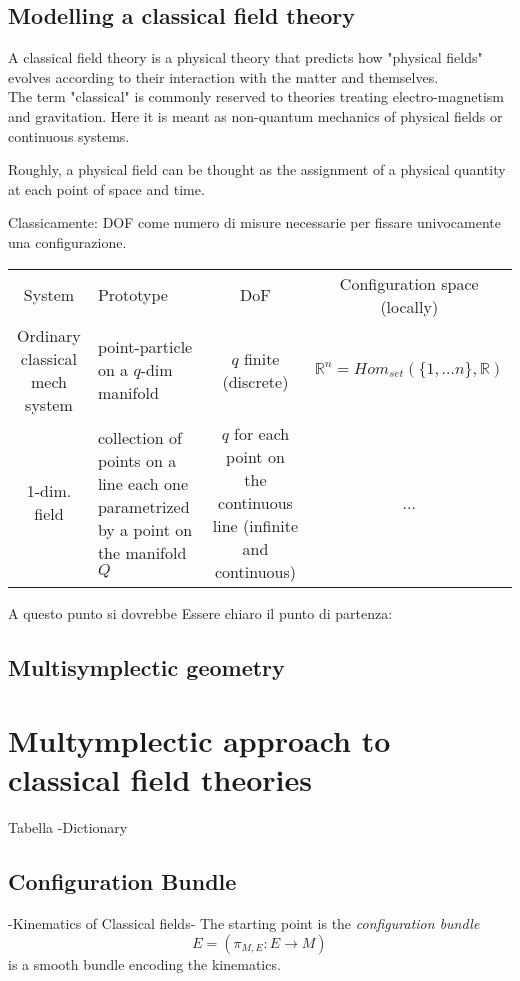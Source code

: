 \subsection{Modelling a classical field theory}
A classical field theory is a physical theory that predicts how "physical fields" evolves according to their interaction with the matter and themselves.
\\
The term "classical" is commonly reserved to theories treating electro-magnetism and gravitation. Here it is meant as non-quantum mechanics of physical fields or continuous systems.

Roughly, a physical field can be thought as the assignment of a physical quantity at each point of space and time.


Classicamente: DOF come numero di misure necessarie per fissare univocamente una configurazione.

\begin{tabularx}{\textwidth}{c X c c}
	System & Prototype & DoF & Configuration space (locally)\\
	Ordinary classical mech system & point-particle on a  $q$-dim manifold &
	$q$ finite (discrete) & $\mathbb{R}^n = Hom_{set}(\{1,\ldots n\}, \mathbb{R})$ \\
	1-dim. field & collection of points on a line each one parametrized by a point on the manifold $Q$ & $q$ for each point on the continuous line (infinite and continuous) &
	...
\end{tabularx}


A questo punto si dovrebbe Essere chiaro il punto di partenza:
\\

\subsection{Multisymplectic geometry}


\section{Multymplectic approach to classical field theories}
Tabella -Dictionary


\subsection{Configuration Bundle}
-Kinematics of Classical fields-
The starting point is the \emph{configuration bundle} 
 	\begin{displaymath}
 		E = \left( \pi_{M,E} : E\rightarrow M \right)
 	\end{displaymath}
is a smooth bundle encoding the kinematics.

